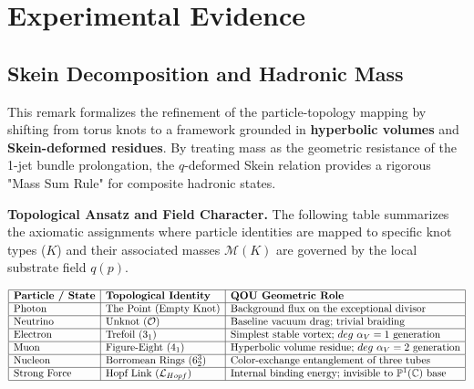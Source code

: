 \chapter{Experimental Evidence}
\label{chap:experimental}

\section{Skein Decomposition and Hadronic Mass}
\label{sec:skein-hadronic-mass}

\begin{remark}
  \label{rem:skein-decomposition}
This remark formalizes the refinement of the particle-topology mapping by shifting from torus knots to a framework grounded in \textbf{hyperbolic volumes} and \textbf{Skein-deformed residues}. By treating mass as the geometric resistance of the 1-jet bundle prolongation, the $q$-deformed Skein relation provides a rigorous "Mass Sum Rule" for composite hadronic states.

\textbf{Topological Ansatz and Field Character.}
The following table summarizes the axiomatic assignments where particle identities are mapped to specific knot types ($K$) and their associated masses $\mathcal{M}(K)$ are governed by the local substrate field $q(p)$.

$$
\begin{array}{|l|l|l|}
\hline
\textbf{Particle / State} & \textbf{Topological Identity} & \textbf{QOU Geometric Role} \\ \hline
\text{Photon} & \text{The Point (Empty Knot)} & \text{Background flux on the exceptional divisor} \\ \hline
\text{Neutrino} & \text{Unknot } (\mathcal{O}) & \text{Baseline vacuum drag; trivial braiding} \\ \hline
\text{Electron} & \text{Trefoil } (3_1) & \text{Simplest stable vortex; } deg~\alpha_V = 1 \text{ generation} \\ \hline
\text{Muon} & \text{Figure-Eight } (4_1) & \text{Hyperbolic volume residue; } deg~\alpha_V = 2 \text{ generation} \\ \hline
\text{Nucleon} & \text{Borromean Rings } (6_2^3) & \text{Color-exchange entanglement of three tubes} \\ \hline
\text{Strong Force} & \text{Hopf Link } (\mathcal{L}_{Hopf}) & \text{Internal binding energy; invisible to } \mathbb{P}^1(\mathbb{C}) \text{ base} \\ \hline
\end{array}
$$
\end{remark}

